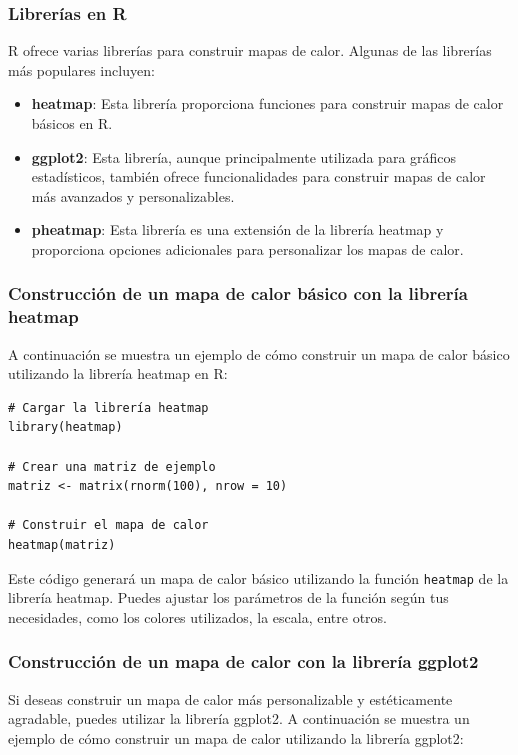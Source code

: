 \documentclass{article}
\begin{document}
\subsubsection{Librerías en R}
R ofrece varias librerías para construir mapas de calor. Algunas de las librerías más populares incluyen:

\begin{itemize}
    \item \textbf{heatmap}: Esta librería proporciona funciones para construir mapas de calor básicos en R.
    \item \textbf{ggplot2}: Esta librería, aunque principalmente utilizada para gráficos estadísticos, también ofrece funcionalidades para construir mapas de calor más avanzados y personalizables.
    \item \textbf{pheatmap}: Esta librería es una extensión de la librería heatmap y proporciona opciones adicionales para personalizar los mapas de calor.
\end{itemize}

\subsubsection{Construcción de un mapa de calor básico con la librería heatmap}
A continuación se muestra un ejemplo de cómo construir un mapa de calor básico utilizando la librería heatmap en R:

\begin{verbatim}
# Cargar la librería heatmap
library(heatmap)

# Crear una matriz de ejemplo
matriz <- matrix(rnorm(100), nrow = 10)

# Construir el mapa de calor
heatmap(matriz)
\end{verbatim}

Este código generará un mapa de calor básico utilizando la función \texttt{heatmap} de la librería heatmap. Puedes ajustar los parámetros de la función según tus necesidades, como los colores utilizados, la escala, entre otros.

\subsubsection{Construcción de un mapa de calor con la librería ggplot2}
Si deseas construir un mapa de calor más personalizable y estéticamente agradable, puedes utilizar la librería ggplot2. A continuación se muestra un ejemplo de cómo construir un mapa de calor utilizando la librería ggplot2:
\end{document}
